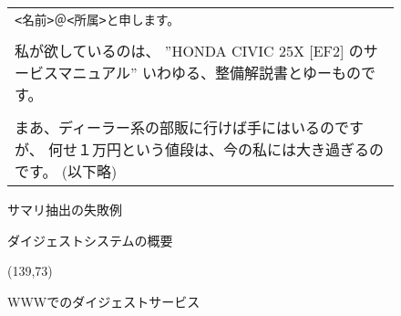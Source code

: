 \begin{figure}
\begin{screen} \small
\noindent
\begin{tabular}{@{}p{\textwidth}@{}}
\verb+<名前>＠<所属>と申します。+ \\
\\
私が欲しているのは、
”HONDA CIVIC 25X [EF2] のサービスマニュアル”
いわゆる、整備解説書とゆーものです。\\
\\
まあ、ディーラー系の部販に行けば手にはいるのですが、
何せ１万円という値段は、今の私には大き過ぎるのです。
(以下略)
\end{tabular}
\end{screen}
\caption{サマリ抽出の失敗例}
\label{fig:extract_error}
\end{figure}

\begin{figure}
\begin{center} \small
{}
\end{center}
\caption{ダイジェストシステムの概要}
\label{fig:system}
\end{figure}

\clearpage

\begin{figure}[h]
\begin{center}
\atari(139,73)
\end{center}
\caption{WWWでのダイジェストサービス}
\label{fig:digest}
\end{figure}

